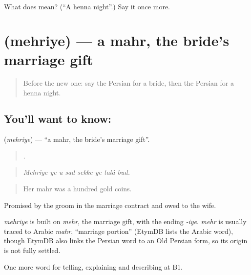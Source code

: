 \begin{tcolorbox}[breakable,colback=teal!4,colframe=teal!35!black,title={Before you move on}]
What does  mean? (\textquotedblleft{}A henna night\textquotedblright{}.) Say it once more.
\end{tcolorbox}
\section[\texorpdfstring{\fa{مهریه} (mehriye)}{مهریه (mehriye)}]{ (mehriye) — a mahr, the bride's marriage gift}

\label{lesson:FA-C335-mehriye}



\begin{quote}
Before the new one: say the Persian for a bride, then the Persian for a henna night.
\end{quote}

\subsection*{You'll want to know: }
\textbf{} (\emph{mehriye}) — \textquotedblleft{}a mahr, the bride's marriage gift\textquotedblright{}.

\begin{quote}
     .
\end{quote}

\begin{quote}
\emph{Mehriye-ye u sad sekke-ye talâ bud.}
\end{quote}

\begin{quote}
Her mahr was a hundred gold coins.
\end{quote}

Promised by the groom in the marriage contract and owed to the wife.

\begin{cousinweb}
\emph{mehriye} is built on \emph{mehr}, the marriage gift, with the ending \emph{-iye}. \emph{mehr} is usually traced to Arabic \emph{mahr}, \textquotedblleft{}marriage portion\textquotedblright{} (EtymDB lists the Arabic word), though EtymDB also links the Persian word to an Old Persian form, so its origin is not fully settled.
\end{cousinweb}

\begin{grammarlens}[title={What you've built}]
One more word for telling, explaining and describing at B1.
\end{grammarlens}

